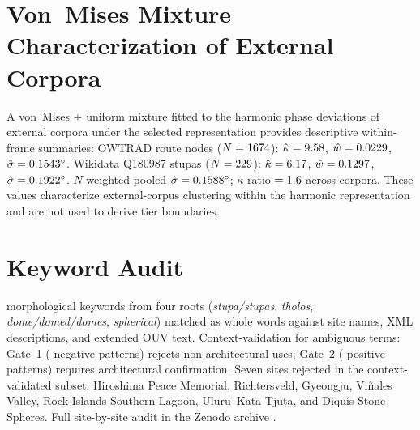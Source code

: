\documentclass[12pt,a4paper]{article}
\begin{document}
\section{Von~Mises Mixture Characterization of External Corpora}
\label{app:vonmises}

A von~Mises + uniform mixture fitted to the harmonic phase deviations of
external corpora under the selected representation provides descriptive
within-frame summaries:
OWTRAD route nodes ($N = 1674{}$):
$\hat{\kappa} = 9.58{}$, $\hat{w} = 0.0229{}$,
$\hat{\sigma} = 0.1543{}^\circ$.
Wikidata Q180987 stupas ($N = 229{}$):
$\hat{\kappa} = 6.17{}$, $\hat{w} = 0.1297{}$,
$\hat{\sigma} = 0.1922{}^\circ$.
$N$-weighted pooled $\hat{\sigma} = 0.1588{}^\circ$;
$\kappa$ ratio $= 1.6{}$ across corpora.
These values characterize external-corpus clustering within the harmonic
representation and are not used to derive tier boundaries.

\section{Keyword Audit}
\label{app:keywords}

\NcircKeywords{} morphological keywords from four roots (\textit{stupa/stupas},
\textit{tholos}, \textit{dome/domed/domes}, \textit{spherical}) matched as
whole words against site names, XML descriptions, and extended OUV text.
Context-validation for ambiguous terms: Gate~1 (\NdomeGateNeg{} negative
patterns) rejects non-architectural uses; Gate~2 (\NdomeGatePos{} positive
patterns) requires architectural confirmation.
Seven sites rejected in the context-validated subset:
Hiroshima Peace Memorial, Richtersveld, Gyeongju,
Vi\~{n}ales Valley, Rock Islands Southern Lagoon, Uluru--Kata Tju\d{t}a,
and Diqu\'{i}s Stone Spheres.
Full site-by-site audit in the Zenodo archive \citep{tenenbaum2026audit}.

\end{document}
